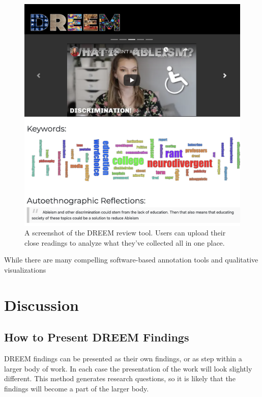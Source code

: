 \begin{figure}
    \centering
    \includegraphics[width=\linewidth]{Figures/Reviewer.png}
    \caption{A screenshot of the DREEM review tool. Users can upload their close readings to analyze what they've collected all in one place.}
    \label{fig:reviewer}
\end{figure}
While there are many compelling software-based annotation tools and qualitative visualizations 

\section{Discussion} \label{Discussion}

\subsection{How to Present DREEM Findings}
DREEM findings can be presented as their own findings, or as step within a larger body of work. In each case the presentation of the work will look slightly different. This method generates research questions, so it is likely that the findings will become a part of the larger body. 

